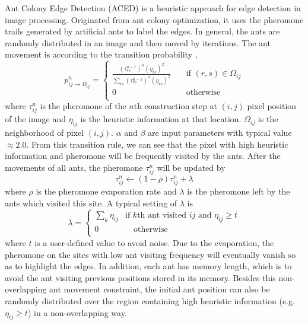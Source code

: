 \documentclass[letterpaper]{article}
\begin{document}
Ant Colony Edge Detection (ACED) is a heuristic approach for edge detection in image processing. Originated from ant colony optimization, it uses the pheromone trails generated by artificial ants to label the edges. In general, the ants are randomly distributed in an image and then moved by iterations. The ant movement is according to the transition probability \cite{nezamabadi2006edge, tian2008ant, LIU2015147},
\begin{equation*}
p^n_{ij\rightarrow \Omega_{ij}} =
\begin{cases}
\frac{\left(\tau_{rs}^{n-1}\right)^\alpha\left(\eta_{rs}\right)^\beta}{\sum_{rs}\left(\tau_{rs}^{n-1}\right)^\alpha\left(\eta_{rs}\right)^\beta} &\quad \text{if $(r,s)\in\Omega_{ij}$} \\
0 & \quad \text{otherwise} \\
\end{cases} 
\end{equation*}    
where $\tau^n_{ij}$ is the pheromone of the $n$th construction step at $(i,j)$ pixel position of the image and $\eta_{ij}$ is the heuristic information at that location. $\Omega_{ij}$ is the neighborhood of pixel $(i,j)$. $\alpha$ and $\beta$ are input parameters with typical value $\approx 2.0$. From this transition rule, we can see that the pixel with high heuristic information and pheromone will be frequently visited by the ants. After the movements of all ants, the pheromone $\tau^n_{ij}$ will be updated by
\begin{equation*}
\tau^n_{ij}\leftarrow(1-\rho)\tau^n_{ij}+\lambda
\end{equation*}
where $\rho$ is the pheromone evaporation rate and $\lambda$ is the pheromone left by the ants which visited this site. A typical setting of $\lambda$ \cite{nezamabadi2006edge, LIU2015147} is
\begin{equation*}
\lambda =
\begin{cases}
\sum_{k}\eta_{ij} & \text{if $k$th ant visited $ij$ and $\eta_{ij}\geq t$} \\
0 & \quad \text{otherwise} \\
\end{cases} 
\end{equation*}
where $t$ is a user-defined value to avoid noise. Due to the evaporation, the pheromone on the sites with low ant visiting frequency will eventually vanish so as to highlight the edges. In addition, each ant has memory length, which is to avoid the ant visiting previous positions stored in its memory. Besides this non-overlapping ant movement constraint, the initial ant position can also be randomly distributed over the region containing high heuristic information (e.g. $\eta_{ij}\geq t$) in a non-overlapping way.
\end{document}
